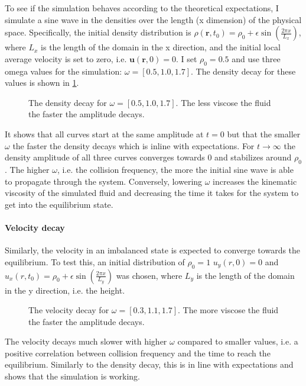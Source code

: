 To see if the simulation behaves according to the theoretical expectations, I simulate a sine wave in the densities over the length (x dimension) of the physical space.
Specifically, the initial density distribution is $\rho (\textbf{r},t_{0})=\rho_{0}+\epsilon \sin \left( \frac{2\pi x}{L_{x}} \right)$, where $L_{x}$ is the length of the domain in the x direction, and the initial local average velocity is set to zero, i.e. $\textbf{u}(\textbf{r},0)=0$.
I set $\rho_{0}=0.5$ and use three omega values for the simulation: $\omega=[0.5,1.0,1.7]$.
The density decay for these values is shown in \ref{fig:m3-1}.
\begin{figure}[ht]
\centering
\resizebox{\columnwidth}{!}{\large}
\vspace*{-10mm}
\caption[Density decay]{The density decay for $\omega=[0.5,1.0,1.7]$. The less viscose the fluid the faster the amplitude decays.}
\label{fig:m3-1}
\end{figure}
It shows that all curves start at the same amplitude at $t=0$ but that the smaller $\omega$ the faster the density decays which is inline with expectations. 
For $t\rightarrow \infty$ the density amplitude of all three curves converges towards $0$ and stabilizes around $\rho_{0}$.
The higher $\omega$, i.e. the collision frequency, the more the initial sine wave is able to propagate through the system. Conversely, lowering $\omega$ increases the kinematic viscosity of the simulated fluid and decreasing the time it takes for the system to get into the equilibrium state.


\paragraph{Velocity decay}
Similarly, the velocity in an imbalanced state is expected to converge towards the equilibrium.
To test this, an initial distribution of $\rho_{0}=1$ $u_{y}(r,0)=0$ and $u_{x}(r,t_{0})=\rho_{0}+\epsilon \sin \left( \frac{2\pi x}{L_{y}} \right)$ was chosen, where $L_{y}$ is the length of the domain in the y direction, i.e. the height.
\begin{figure}[ht]
\centering
\resizebox{\columnwidth}{!}{\large}
\vspace*{-10mm}
\caption[Velocity decay]{The velocity decay for $\omega=[0.3,1.1,1.7]$. The more viscose the fluid the faster the amplitude decays.}
\label{fig:m3-2-vel}
\end{figure}
The velocity decays much slower with higher $\omega$ compared to smaller values, i.e. a positive correlation between collision frequency and the time to reach the equilibrium.
Similarly to the density decay, this is in line with expectations and shows that the simulation is working.

